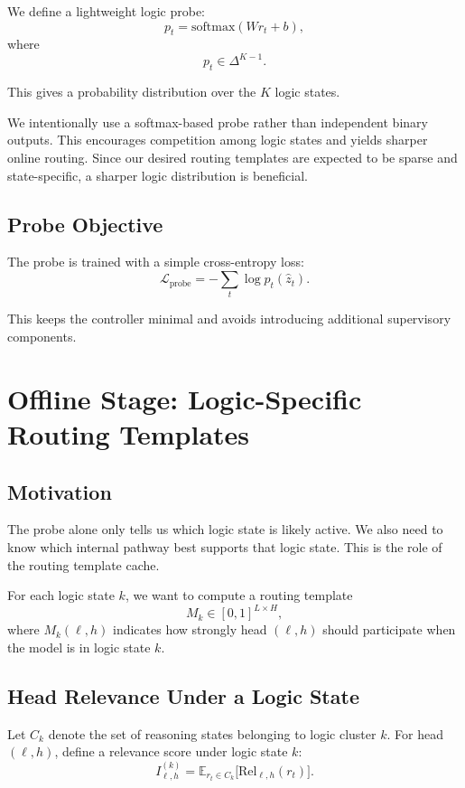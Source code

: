\documentclass[11pt]{article}
\begin{document}
We define a lightweight logic probe:
\[
p_t = \mathrm{softmax}(W r_t + b),
\]
where
\[
p_t \in \Delta^{K-1}.
\]

This gives a probability distribution over the $K$ logic states.

We intentionally use a softmax-based probe rather than independent binary outputs. This encourages competition among logic states and yields sharper online routing. Since our desired routing templates are expected to be sparse and state-specific, a sharper logic distribution is beneficial.

\subsection{Probe Objective}

The probe is trained with a simple cross-entropy loss:
\[
\mathcal{L}_{\text{probe}}
=
-\sum_t \log p_t(\hat{z}_t).
\]

This keeps the controller minimal and avoids introducing additional supervisory components.

\section{Offline Stage: Logic-Specific Routing Templates}

\subsection{Motivation}

The probe alone only tells us which logic state is likely active. We also need to know which internal pathway best supports that logic state. This is the role of the routing template cache.

For each logic state $k$, we want to compute a routing template
\[
M_k \in [0,1]^{L\times H},
\]
where $M_k(\ell,h)$ indicates how strongly head $(\ell,h)$ should participate when the model is in logic state $k$.

\subsection{Head Relevance Under a Logic State}

Let $C_k$ denote the set of reasoning states belonging to logic cluster $k$. For head $(\ell,h)$, define a relevance score under logic state $k$:
\[
I_{\ell,h}^{(k)} = \mathbb{E}_{r_t \in C_k}\big[\mathrm{Rel}_{\ell,h}(r_t)\big].
\]
\end{document}
